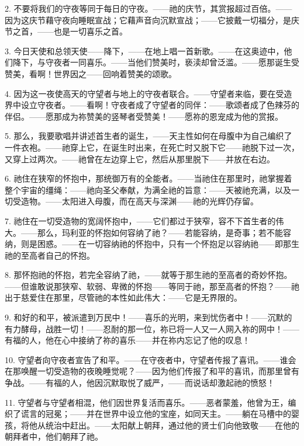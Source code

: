 2. 不要将我们的守夜等同于每日的守夜。——祂的庆节，其赏报超过百倍。——因为这庆节藉守夜向睡眠宣战；它藉声音向沉默宣战；——它披戴一切福分，是庆节之首，——也是一切喜乐之首。\par

3. 今日天使和总领天使——降下，——在地上唱一首新歌。——在这奥迹中，他们降下，与守夜者一同喜乐。——当他们赞美时，亵渎却曾泛滥。——愿那诞生受赞美，看啊！世界因之——回响着赞美的颂歌。\par

4. 因为这一夜使高天的守望者与地上的守夜者联合。——守望者来临，要在受造界中设立守夜者。——看啊！守夜者成了守望者的同伴：——歌颂者成了色辣芬的伴侣。——愿那成为祢赞美的竖琴者受赞美！——愿祢的恩宠成为他的赏报。\par

5. 那么，我要歌唱并讲述首生者的诞生，——天主性如何在母腹中为自己编织了一件衣袍。——祂穿上它，在诞生时出来，在死亡时又脱下它——祂脱下过一次，又穿上过两次。——祂曾在左边穿上它，然后从那里脱下——并放在右边。\par

6. 祂住在狭窄的怀抱中，那统御万有的全能者。——当祂住在那里时，祂掌握着整个宇宙的缰绳：——祂向圣父奉献，为满全祂的旨意：——天被祂充满，以及一切受造物。——太阳进入母腹，而在高天与深渊——祂的光辉仍存留。\par

7. 祂住在一切受造物的宽阔怀抱中，——它们都过于狭窄，容不下首生者的伟大。——那么，玛利亚的怀抱如何容纳了祂？——若能容纳，是奇事；若不能容纳，则是困惑。——在一切容纳祂的怀抱中，只有一个怀抱足以容纳祂——即那生祂的至高者自己的怀抱。\par

8. 那怀抱祂的怀抱，若完全容纳了祂，——就等于那生祂的至高者的奇妙怀抱。——但谁敢说那狭窄、软弱、卑微的怀抱——等同于祂，那至高者的怀抱？——祂出于慈爱住在那里，尽管祂的本性如此伟大：——它是无界限的。\par

9. 和好的和平，被派遣到万民中！——喜乐的光明，来到忧伤者中！——沉默的有力酵母，战胜一切！——忍耐的那一位，祢已将一人又一人网入祢的网中！——有福的人，他在心中接纳了祢的喜乐——并在祢内忘记了他的叹息！\par

10. 守望者向守夜者宣告了和平。——在守夜者中，守望者传报了喜讯。——谁会在那唤醒一切受造物的夜晚睡觉呢？——因为他们传报了和平的喜讯，而那里曾有争战。——有福的人，他因沉默取悦了威严，——而说话却激起祂的愤怒！\par

11. 守望者与守望者相混，他们因世界复活而喜乐。——恶者蒙羞，他曾为王，编织了谎言的冠冕；——并在世界中设立他的宝座，如同天主。——躺在马槽中的婴孩，将他从统治中赶出。——太阳献上朝拜，通过他的贤士们向他致敬——在他的朝拜者中，他们朝拜了祂。\par

